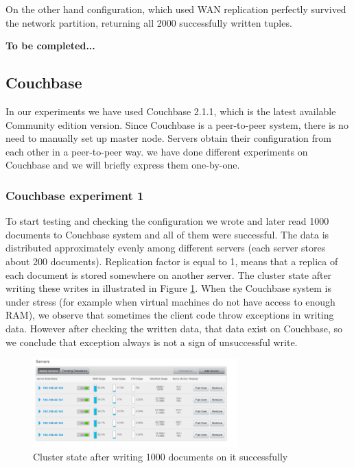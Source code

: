 \documentclass[a4paper]{article}
\begin{document}
On the other hand configuration, which used WAN replication perfectly survived the network partition, returning all 2000 successfully written tuples.

{\bf To be completed...}

\subsection{Couchbase}

In our experiments we have used Couchbase 2.1.1, which is the latest available Community edition version. 
Since Couchbase is a peer-to-peer system, there is no need to manually set up master node. 
Servers obtain their configuration from each other in a peer-to-peer way.
we have done different experiments on Couchbase and we will briefly express them one-by-one.

\subsubsection{Couchbase experiment 1}
To start testing and checking the configuration we wrote and later read 1000 documents to Couchbase system and all of them were successful. 
The data is distributed approximately evenly among different servers (each server stores about 200 documents).
Replication factor is equal to 1, means that a replica of each document is stored somewhere on another server.
The cluster state after writing these writes in illustrated in Figure \ref{fig:diagram1}.
When the Couchbase system is under stress (for example when virtual machines do not have access to enough RAM), we observe that sometimes the client code throw exceptions in writing data.
However after checking the written data, that data exist on Couchbase, so we conclude that exception always is not a sign of unsuccessful write.  

\begin{figure}[h!]
	\centering
	\includegraphics[width=0.7\textwidth]{diagram1}
	\caption{Cluster state after writing 1000 documents on it successfully}
	\label{fig:diagram1}
\end{figure}
\end{document}
